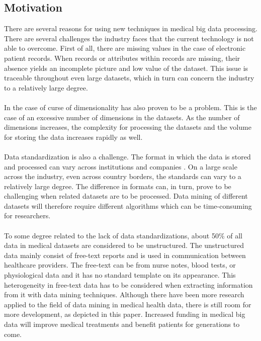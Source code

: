 \subsection{Motivation}
There are several reasons for using new techniques in medical big data processing. There are several challenges the industry faces that the current technology is not able to overcome. First of all, there are missing values in the case of electronic patient records\cite{wp}. When records or attributes within records are missing, their absence yields an incomplete picture and low value of the dataset. This issue is traceable throughout even large datasets, which in turn can concern the industry to a relatively large degree. 
\\\\
In the case of curse of dimensionality has also proven to be a problem.
This is the case of an excessive number of dimensions in the datasets. As the number of dimensions increases, the complexity for processing the datasets and the volume for storing the data increases rapidly as well. 
\\\\
Data standardization is also a challenge. The format in which the data is stored and processed can vary across institutions and companies . On a large scale across the industry, even across country borders, the standards can vary to a relatively large degree. The difference in formats can, in turn, prove to be challenging when related datasets are to be processed. Data mining of different datasets will therefore require different algorithms which can be time-consuming for researchers. 
\\\\
To some degree related to the lack of data standardizations, about 50\% of all data in medical datasets are considered to be unstructured\cite{wp}. The unstructured data mainly consist of free-text reports and is used in communication between healthcare providers. The free-text can be from nurse notes, blood tests, or physiological data and it has no standard template on its appearance. This heterogeneity in free-text data has to be considered when extracting information from it with data mining techniques. Although there have been more research applied to the field of data mining in medical health data, there is still room for more development, as depicted in this paper. Increased funding in medical big data will improve medical treatments and benefit patients for generations to come. 



